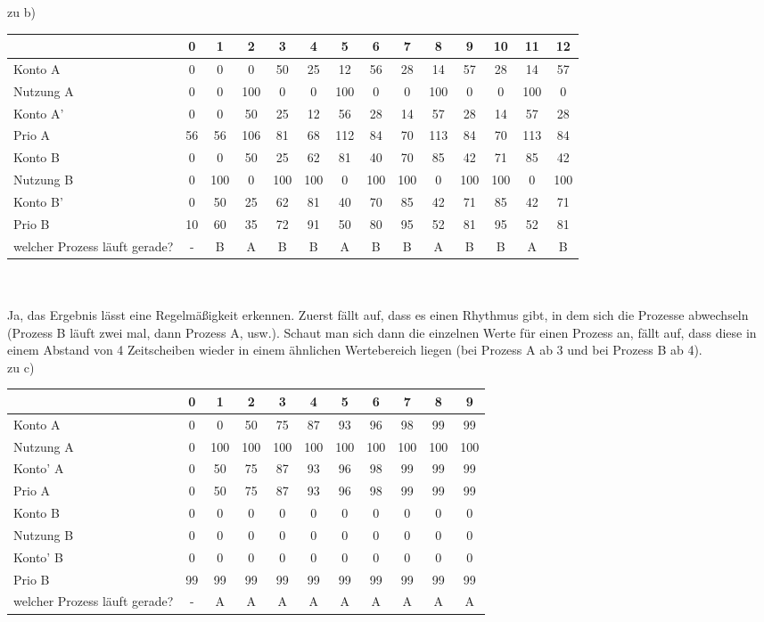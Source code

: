\documentclass{ti2}
\begin{document}
zu b) \\
\begin{tabular}[h]{|p{2cm}||c|c|c|c|c|c|c|c|c|c|c|c|c|}
	\hline
	& 0 & 1 & 2 & 3 & 4 & 5 & 6 & 7 & 8 & 9 & 10 & 11 & 12 \\
	\hline
	\hline
	Konto A & 0 & 0 & 0 & 50 & 25 & 12 & 56 & 28 & 14 & 57 & 28 & 14 & 57 \\
	\hline
	Nutzung A & 0 & 0 & 100 & 0 & 0 & 100 & 0 & 0 & 100 & 0 & 0 & 100 & 0 \\
	\hline
	Konto A'& 0 & 0 & 50 & 25 & 12 & 56 & 28 & 14 & 57 & 28 & 14 & 57 & 28 \\
	\hline
	Prio A & 56 & 56 & 106 & 81 & 68 & 112 & 84 & 70 & 113 & 84 & 70 & 113 & 84 \\
	\hline
	\hline
	Konto B & 0 & 0 & 50 & 25 & 62 & 81 & 40 & 70 & 85 & 42 & 71 & 85 & 42 \\
	\hline
	Nutzung B & 0 & 100 & 0 & 100 & 100 & 0 & 100 & 100 & 0 & 100 & 100 & 0 & 100 \\
	\hline
	Konto B' & 0 & 50 & 25 & 62 & 81 & 40 & 70 & 85 & 42 & 71 & 85 & 42 & 71 \\
	\hline
	Prio B & 10 & 60 & 35 & 72 & 91 & 50 & 80 & 95 & 52 & 81 & 95 & 52 & 81 \\
	\hline
	\hline
	welcher Prozess läuft gerade? & - & B & A & B & B & A & B & B & A & B & B & A & B \\
	\hline
\end{tabular} \\\\
Ja, das Ergebnis lässt eine Regelmäßigkeit erkennen. Zuerst fällt auf, dass es einen Rhythmus gibt, in dem sich die Prozesse abwechseln (Prozess B läuft zwei mal, dann Prozess A, usw.). Schaut man sich dann die einzelnen Werte für einen Prozess an, fällt auf, dass diese in einem Abstand von 4 Zeitscheiben wieder in einem ähnlichen Wertebereich liegen (bei Prozess A ab 3 und bei Prozess B ab 4). \\
zu c) \\
\begin{tabular}[h]{|p{2cm}||c|c|c|c|c|c|c|c|c|c|}
	\hline
	& 0 & 1 & 2 & 3 & 4 & 5 & 6 & 7 & 8 & 9 \\
	\hline
	\hline
	Konto A & 0 & 0 & 50 & 75 & 87 & 93 & 96 & 98 & 99 & 99  \\
	\hline
	Nutzung A & 0 & 100 & 100 & 100 & 100 & 100 & 100 & 100 & 100 & 100  \\
	\hline
	Konto' A& 0 & 50 & 75 & 87 & 93 & 96 & 98 & 99 & 99 & 99  \\
	\hline
	Prio A & 0 & 50 & 75 & 87 & 93 & 96 & 98 & 99 & 99 & 99 \\
	\hline
	\hline
	Konto B & 0 & 0 & 0 & 0 & 0 & 0 & 0 & 0 & 0 & 0 \\
	\hline
	Nutzung B & 0 & 0 & 0 & 0 & 0 & 0 & 0 & 0 & 0 & 0 \\
	\hline
	Konto' B & 0 & 0 & 0 & 0 & 0 & 0 & 0 & 0 & 0 & 0 \\
	\hline
	Prio B & 99 & 99 & 99 & 99 & 99 & 99 & 99 & 99 & 99 & 99 \\
	\hline
	\hline
	welcher Prozess läuft gerade? & - & A & A & A & A & A & A & A & A & A \\
	\hline
\end{tabular} \\\\
\end{document}
